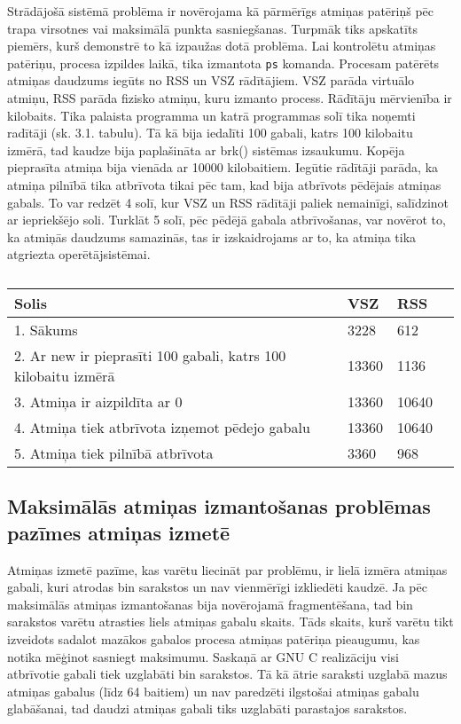 Strādājošā sistēmā problēma ir novērojama kā pārmērīgs atmiņas patēriņš pēc trapa virsotnes vai maksimālā punkta sasniegšanas.
Turpmāk tiks apskatīts piemērs, kurš demonstrē to kā izpaužas dotā problēma.
Lai kontrolētu atmiņas patēriņu, procesa izpildes laikā, tika izmantota \texttt{ps} komanda.
Procesam patērēts atmiņas daudzums iegūts no RSS un VSZ rādītājiem.
VSZ parāda virtuālo atmiņu, RSS parāda fizisko atmiņu, kuru izmanto process.
Rādītāju mērvienība ir kilobaits.
Tika palaista programma un katrā programmas solī tika noņemti radītāji (sk. 3.1. tabulu).
Tā kā bija iedalīti 100 gabali, katrs 100 kilobaitu izmērā, tad kaudze bija paplašināta ar brk() sistēmas izsaukumu.
Kopēja pieprasīta atmiņa bija vienāda ar 10000 kilobaitiem.
Iegūtie rādītāji parāda, ka atmiņa pilnībā tika atbrīvota tikai pēc tam, kad bija atbrīvots pēdējais atmiņas gabals.
To var redzēt 4 solī, kur VSZ un RSS rādītāji paliek nemainīgi, salīdzinot ar iepriekšējo soli.
Turklāt 5 solī, pēc pēdējā gabala atbrīvošanas, var novērot to, ka atmiņās daudzums samazinās, tas ir izskaidrojams ar to, ka atmiņa tika atgriezta operētājsistēmai.


\begin{table}[H]
\caption{\textbf{\fontsize{11}{12}\selectfont {Programmas RSS un VSZ radītāji}}}
\label{table:kysymys}
\centering
	\begin{tabular}{|l|l|l|p{5cm}|}
	  \hline
	Solis & VSZ & RSS \\
    \hline
    1. Sākums & 3228 & 612 \\
	\hline
	 2. Ar new ir pieprasīti 100 gabali, katrs 100 kilobaitu izmērā  & 13360  & 1136 \\
      \hline
     3. Atmiņa ir aizpildīta ar 0 &  13360 & 10640\\
      \hline
     4. Atmiņa tiek atbrīvota izņemot pēdejo gabalu & 13360 & 10640 \\
      \hline
     5. Atmiņa tiek pilnībā atbrīvota & 3360 & 968 \\
    \hline
	\end{tabular}
\end{table}


\subsection{Maksimālās atmiņas izmantošanas problēmas pazīmes atmiņas izmetē}
Atmiņas izmetē pazīme, kas varētu liecināt par problēmu, ir lielā izmēra atmiņas gabali, kuri atrodas bin sarakstos un nav vienmērīgi  izkliedēti kaudzē.
Ja pēc maksimālās atmiņas izmantošanas bija novērojamā fragmentēšana, tad bin sarakstos varētu atrasties liels atmiņas gabalu skaits.
Tāds skaits, kurš varētu tikt izveidots sadalot mazākos gabalos procesa atmiņas patēriņa pieaugumu, kas notika mēģinot sasniegt maksimumu.
Saskaņā ar GNU C realizāciju visi atbrīvotie gabali tiek uzglabāti bin sarakstos.
Tā kā ātrie saraksti uzglabā mazus atmiņas gabalus (līdz 64 baitiem) un nav paredzēti ilgstošai atmiņas gabalu glabāšanai, tad daudzi atmiņas gabali tiks uzglabāti parastajos sarakstos.

